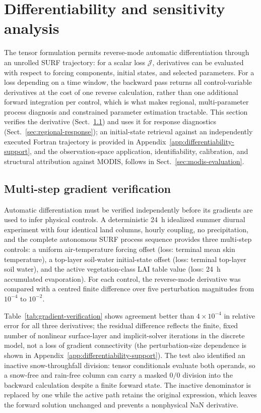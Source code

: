 \section{Differentiability and sensitivity analysis}
\label{sec:gradient-calibration}

The tensor formulation permits reverse-mode automatic differentiation through
an unrolled SURF trajectory: for a scalar loss $\mathcal{J}$, derivatives can
be evaluated with respect to forcing components, initial states, and selected
parameters. For a loss depending on a time window, the backward pass returns
all control-variable derivatives at the cost of one reverse calculation,
rather than one additional forward integration per control, which is what
makes regional, multi-parameter process diagnosis and constrained parameter
estimation tractable. This section verifies the derivative
(Sect.~\ref{sec:gradient-verification}) and uses it for response diagnostics
(Sect.~\ref{sec:regional-response}); an initial-state retrieval against an
independently executed Fortran trajectory is provided in
Appendix~\ref{app:differentiability-support}, and the observation-space
application, identifiability, calibration, and structural attribution
against MODIS, follows in Sect.~\ref{sec:modis-evaluation}.

\subsection{Multi-step gradient verification}
\label{sec:gradient-verification}

Automatic differentiation must be verified independently before its
gradients are used to infer physical controls. A deterministic 24~h
idealized summer diurnal experiment with four identical land columns, hourly
coupling, no precipitation, and the complete autonomous SURF process
sequence provides three multi-step controls: a uniform air-temperature
forcing offset (loss: terminal mean skin temperature), a top-layer soil-water
initial-state offset (loss: terminal top-layer soil water), and the active
vegetation-class LAI table value (loss: 24~h accumulated evaporation). For
each control, the reverse-mode derivative was compared with a centred finite
difference over five perturbation magnitudes from $10^{-4}$ to $10^{-2}$.

Table~\ref{tab:gradient-verification} shows agreement better than
$4\times10^{-4}$ in relative error for all three derivatives; the residual
difference reflects the finite, fixed number of nonlinear surface-layer and
implicit-solver iterations in the discrete model, not a loss of gradient
connectivity (the perturbation-size dependence is shown in
Appendix~\ref{app:differentiability-support}). The test also identified an
inactive snow-throughfall division: tensor conditionals evaluate both
operands, so a snow-free and rain-free column can carry a masked $0/0$
division into the backward calculation despite a finite forward state. The
inactive denominator is replaced by one while the active path retains the
original expression, which leaves the forward solution unchanged and
prevents a nonphysical NaN derivative.

